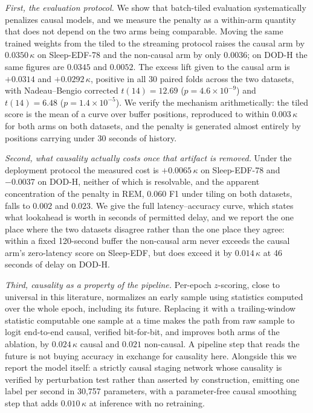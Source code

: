 \documentclass[conference]{IEEEtran}
\begin{document}
\emph{First, the evaluation protocol.} We show that batch-tiled evaluation systematically
penalizes causal models, and we measure the penalty as a within-arm quantity that does not
depend on the two arms being comparable. Moving the same trained weights from the tiled to the
streaming protocol raises the causal arm by $0.0350\,\kappa$ on Sleep-EDF-78 and the non-causal
arm by only $0.0036$; on DOD-H the same figures are $0.0345$ and $0.0052$. The excess lift
given to the causal arm is $+0.0314$ and $+0.0292\,\kappa$, positive in all 30 paired folds
across the two datasets, with Nadeau--Bengio corrected $t(14) = 12.69$ ($p = 4.6\times10^{-9}$)
and $t(14) = 6.48$ ($p = 1.4\times10^{-5}$). We verify the mechanism arithmetically: the tiled
score is the mean of a curve over buffer positions, reproduced to within $0.003\,\kappa$ for
both arms on both datasets, and the penalty is generated almost entirely by positions carrying
under 30 seconds of history.

\emph{Second, what causality actually costs once that artifact is removed.} Under the
deployment protocol the measured cost is $+0.0065\,\kappa$ on Sleep-EDF-78 and $-0.0037$ on
DOD-H, neither of which is resolvable, and the apparent concentration of the penalty in REM,
$0.060$ F1 under tiling on both datasets, falls to $0.002$ and $0.023$. We give the full
latency--accuracy curve, which states what lookahead is worth in seconds of permitted delay,
and we report the one place where the two datasets disagree rather than the one place they
agree: within a fixed 120-second buffer the non-causal arm never exceeds the causal arm's
zero-latency score on Sleep-EDF, but does exceed it by $0.014\,\kappa$ at 46 seconds of delay
on DOD-H.

\emph{Third, causality as a property of the pipeline.} Per-epoch $z$-scoring, close to
universal in this literature, normalizes an early sample using statistics computed over the
whole epoch, including its future. Replacing it with a trailing-window statistic computable one
sample at a time makes the path from raw sample to logit end-to-end causal, verified
bit-for-bit, and improves both arms of the ablation, by $0.024\,\kappa$ causal and $0.021$
non-causal. A pipeline step that reads the future is not buying accuracy in exchange for
causality here. Alongside this we report the model itself: a strictly causal staging network
whose causality is verified by perturbation test rather than asserted by construction, emitting
one label per second in 30{,}757 parameters, with a parameter-free causal smoothing step that
adds $0.010\,\kappa$ at inference with no retraining.
\end{document}
